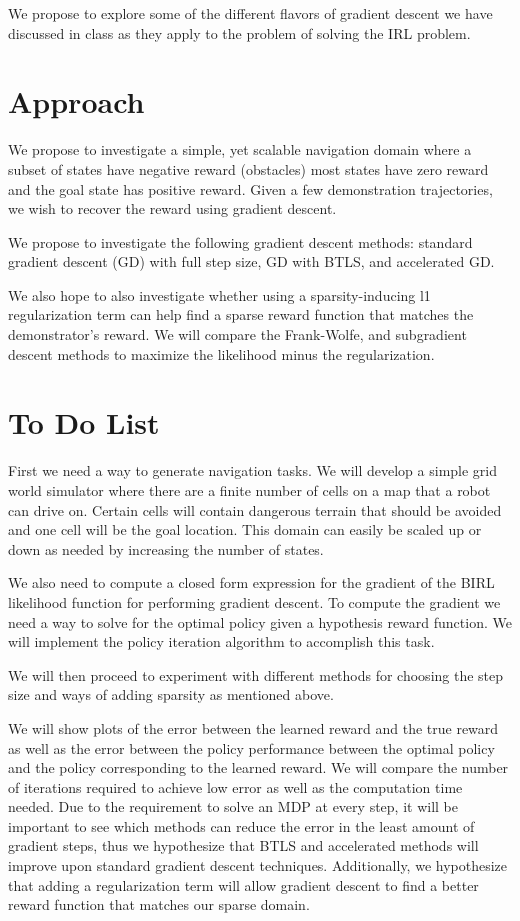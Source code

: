\documentclass[10pt,a4paper]{article}
\begin{document}
We propose to explore some of the different flavors of gradient descent we have discussed in class as they apply to the problem of solving the IRL problem.

\section{Approach}
We propose to investigate a simple, yet scalable navigation domain where a subset of states have negative reward (obstacles) most states have zero reward and the goal state has positive reward. Given a few demonstration trajectories, we wish to recover the reward using gradient descent.

We propose to investigate the following gradient descent methods: standard gradient descent (GD) with full step size, GD with BTLS, and accelerated GD.

We also hope to also investigate whether using a sparsity-inducing l1 regularization term can help find a sparse reward function that matches the demonstrator's reward. We will compare the Frank-Wolfe, and subgradient descent methods to maximize the likelihood minus the regularization. 




\section{To Do List}
First we need a way to generate navigation tasks. We will develop a simple grid world simulator where there are a finite number of cells on a map that a robot can drive on. Certain cells will contain dangerous terrain that should be avoided and one cell will be the goal location. This domain can easily be scaled up or down as needed by increasing the number of states.

We also need to compute a closed form expression for the gradient of the BIRL likelihood function for performing gradient descent. To compute the gradient we need a way to solve for the optimal policy given a hypothesis reward function. We will implement the policy iteration algorithm to accomplish this task. 

We will then proceed to experiment with different methods for choosing the step size and ways of adding sparsity as mentioned above. 

We will show plots of the error between the learned reward and the true reward as well as the error between the policy performance between the optimal policy and the policy corresponding to the learned reward. We will compare the number of iterations required to achieve low error as well as the computation time needed. Due to the requirement to solve an MDP at every step, it will be important to see which methods can reduce the error in the least amount of gradient steps, thus we hypothesize that BTLS and accelerated methods will improve upon standard gradient descent techniques. Additionally, we hypothesize that adding a regularization term will allow gradient descent to find a better reward function that matches our sparse domain.



\end{document}
